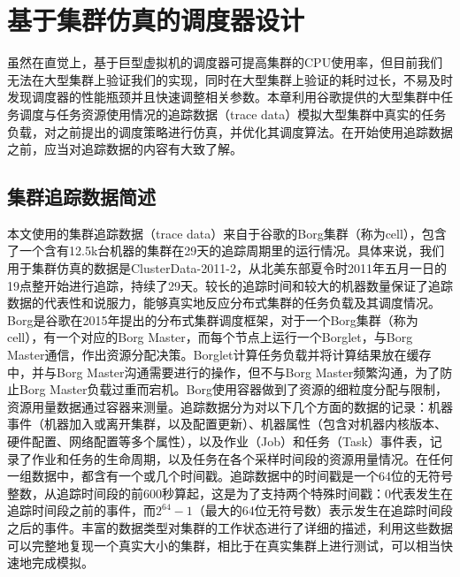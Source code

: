 
\chapter{基于集群仿真的调度器设计}
虽然在直觉上，基于巨型虚拟机的调度器可提高集群的CPU使用率，但目前我们无法在大型集群上验证我们的实现，同时在大型集群上验证的耗时过长，不易及时发现调度器的性能瓶颈并且快速调整相关参数。本章利用谷歌提供的大型集群中任务调度与任务资源使用情况的追踪数据（trace data）模拟大型集群中真实的任务负载，对之前提出的调度策略进行仿真，并优化其调度算法。在开始使用追踪数据之前，应当对追踪数据的内容有大致了解。

\section{集群追踪数据简述}
本文使用的集群追踪数据（trace data）来自于谷歌的Borg集群（称为cell），包含了一个含有12.5k台机器的集群在29天的追踪周期里的运行情况。具体来说，我们用于集群仿真的数据是ClusterData-2011-2，从北美东部夏令时2011年五月一日的19点整开始进行追踪，持续了29天。较长的追踪时间和较大的机器数量保证了追踪数据的代表性和说服力，能够真实地反应分布式集群的任务负载及其调度情况。Borg\cite{borg}是谷歌在2015年提出的分布式集群调度框架，对于一个Borg集群（称为cell），有一个对应的Borg Master，而每个节点上运行一个Borglet，与Borg Master通信，作出资源分配决策。Borglet计算任务负载并将计算结果放在缓存中，并与Borg Master沟通需要进行的操作，但不与Borg Master频繁沟通，为了防止Borg Master负载过重而宕机。Borg使用容器做到了资源的细粒度分配与限制，资源用量数据通过容器来测量。追踪数据分为对以下几个方面的数据的记录：机器事件（机器加入或离开集群，以及配置更新）、机器属性（包含对机器内核版本、硬件配置、网络配置等多个属性），以及作业（Job）和任务（Task）事件表，记录了作业和任务的生命周期，以及任务在各个采样时间段的资源用量情况。在任何一组数据中，都含有一个或几个时间戳。追踪数据中的时间戳是一个64位的无符号整数，从追踪时间段的前600秒算起，这是为了支持两个特殊时间戳：0代表发生在追踪时间段之前的事件，而$2^{64}-1$（最大的64位无符号数）表示发生在追踪时间段之后的事件。丰富的数据类型对集群的工作状态进行了详细的描述，利用这些数据可以完整地复现一个真实大小的集群，相比于在真实集群上进行测试，可以相当快速地完成模拟。

